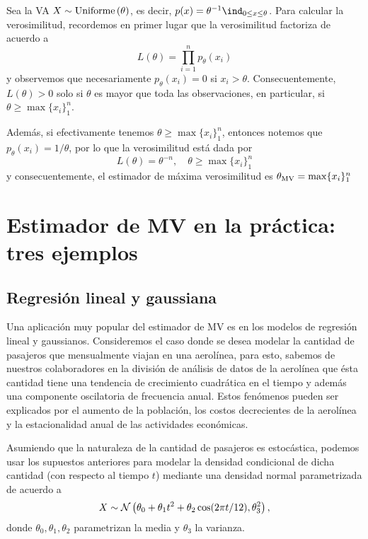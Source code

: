 \begin{example}
	Sea la VA $X\sim\text{Uniforme}\left(\theta\right)$, es decir, $p(x) = \theta^{-1} \ind_{0\leq x \leq \theta}$. Para calcular la verosimilitud, recordemos en primer lugar que la verosimilitud factoriza de acuerdo a  
	\begin{equation}
		L(\theta) = \prod_{i=1}^n p_\theta(x_i)
	\end{equation}
	y observemos que necesariamente $p_\theta(x_i) = 0$ si $x_i>\theta$. Consecuentemente, $L(\theta)>0$ solo si $\theta$ es mayor que toda las observaciones, en particular, si $\theta\geq\max\{x_i\}_1^n$.

	Además, si efectivamente tenemos $\theta\geq\max\{x_i\}_1^n$, entonces notemos que $p_\theta(x_i) = 1/\theta$, por lo que la verosimilitud está dada por
		\begin{equation}
		L(\theta) = \theta^{-n}, \quad \theta\geq\max\{x_i\}_1^n
	\end{equation}
	y consecuentemente, el estimador de máxima verosimilitud es ${\theta_\text{MV}} = \max\{x_i\}_1^n$
\end{example}


\section{Estimador de MV en la práctica: tres ejemplos} %
\label{sub:MV_tres_ejemplos}

\subsection{Regresión lineal y gaussiana} 
\label{sub:reg_lin}


Una aplicación muy popular del estimador de MV es en los modelos de regresión lineal y gaussianos. Consideremos el caso donde se desea modelar la cantidad de pasajeros que mensualmente viajan en una aerolínea, para esto, sabemos de nuestros colaboradores en la división de análisis de datos de la aerolínea que ésta cantidad tiene una tendencia de crecimiento cuadrática en el tiempo y además una componente oscilatoria de frecuencia anual. Estos fenómenos pueden ser explicados por el aumento de la población, los costos decrecientes de la aerolínea y la estacionalidad anual de las actividades económicas. 

Asumiendo que la naturaleza de la cantidad de pasajeros es estocástica, podemos usar los supuestos anteriores para modelar la densidad condicional  de dicha cantidad (con respecto al tiempo $t$) mediante una densidad normal parametrizada de acuerdo a 
\begin{equation}
	X \sim {\mathcal N}\left(\theta_0 + \theta_1 t^2 + \theta_2\cos(2\pi t/12), \theta_3^2\right),
\end{equation}
donde $\theta_0,\theta_1,\theta_2$ parametrizan la media y $\theta_3$ la varianza. 

